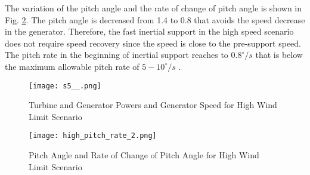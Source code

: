 The variation of the pitch angle and the rate of change of pitch angle is shown in Fig. \ref{pitch_rate}. The pitch angle is decreased from 1.4 to 0.8 that avoids the speed decrease in the generator. Therefore, the fast inertial support in the high speed scenario does not require speed recovery since the speed is close to the pre-support speed. The pitch rate in the beginning of inertial support reaches to $0.8^{\circ}/s$ that is below the maximum allowable pitch rate of $5-10^{\circ}/s$ \cite{Ackermann2005a}. \par
\begin{figure}[h]
	\centering
	\texttt{[image: s5\_\_.png]}
	\caption{Turbine and Generator Powers and Generator Speed for High Wind Limit Scenario}
	\label{high_limit_speed}
\end{figure}
\begin{figure}[h]
	\centering
	\texttt{[image: high\_pitch\_rate\_2.png]}
	\caption{Pitch Angle and Rate of Change of Pitch Angle for High Wind Limit Scenario}
	\label{pitch_rate}
\end{figure}
